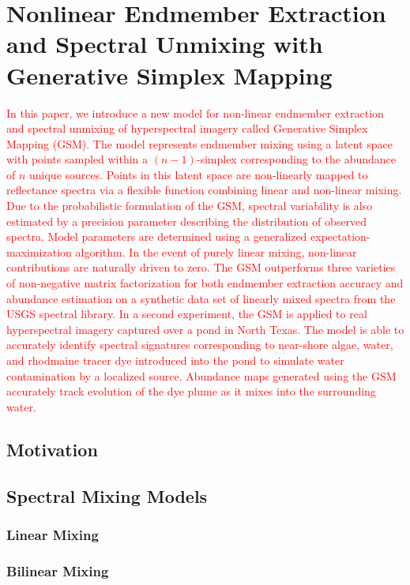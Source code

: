 \chapter{Nonlinear Endmember Extraction and Spectral Unmixing with Generative Simplex Mapping}\label{ch:robot-team-gsm}


\textcolor{red}{
  In this paper, we introduce a new model for non-linear endmember extraction
  and spectral unmixing of hyperspectral imagery called Generative Simplex
  Mapping (GSM). The model represents endmember mixing using a latent space
  with points sampled within a $(n-1)$-simplex corresponding to the abundance
  of $n$ unique sources. Points in this latent space are non-linearly mapped
  to reflectance spectra via a flexible function combining linear and
  non-linear mixing. Due to the probabilistic formulation of the GSM, spectral
  variability is also estimated by a precision parameter describing the
  distribution of observed spectra. Model parameters are determined using a
  generalized expectation-maximization algorithm. In the event of purely
  linear mixing, non-linear contributions are naturally driven to zero. The
  GSM outperforms three varieties of non-negative matrix factorization for
  both endmember extraction accuracy and abundance estimation on a synthetic
  data set of linearly mixed spectra from the USGS spectral library. In a
  second experiment, the GSM is applied to real hyperspectral imagery captured
  over a pond in North Texas. The model is able to accurately identify
  spectral signatures corresponding to near-shore algae, water, and rhodmaine
  tracer dye introduced into the pond to simulate water contamination by a
  localized source. Abundance maps generated using the GSM accurately track
  evolution of the dye plume as it mixes into the surrounding water.
}



\section{Motivation}

\section{Spectral Mixing Models}
\subsection{Linear Mixing}
\subsection{Bilinear Mixing}
